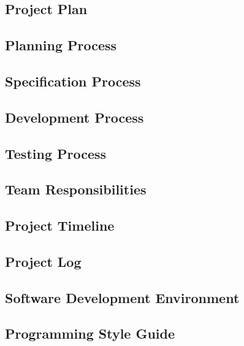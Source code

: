 \begin{homeworkProblem}
	\chapter{Project Plan}
	\section{Planning Process}
	\section{Specification Process}
	\section{Development Process}
	\section{Testing Process}
	\section{Team Responsibilities}
	\section{Project Timeline}
	\section{Project Log}
	\section{Software Development Environment}
	\section{Programming Style Guide}
\end{homeworkProblem}